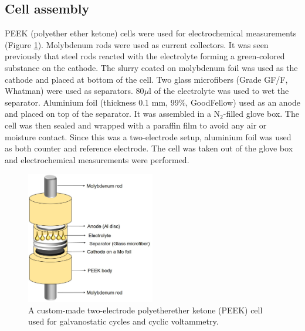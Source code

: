 \documentclass{article}
\begin{document}
\subsection{Cell assembly}
PEEK (polyether ether ketone) cells were used for electrochemical measurements (Figure \ref{fig:PEEK}). Molybdenum rods were used as current collectors. It was seen previously that steel rods reacted with the electrolyte forming a green-colored substance on the cathode. The slurry coated on molybdenum foil was used as the cathode and placed at bottom of the cell. Two glass microfibers (Grade GF/F, Whatman) were used as separators. 80$\mu$l of the electrolyte was used to wet the separator. Aluminium foil (thickness 0.1 mm, 99$\%$, GoodFellow) used as an anode and placed on top of the separator. It was assembled in a N$_2$-filled glove box. The cell was then sealed and wrapped with a paraffin film to avoid any air or moisture contact. Since this was a two-electrode setup, aluminium foil was used as both counter and reference electrode. The cell was taken out of the glove box and electrochemical measurements were performed. 

\begin{figure}[th!]
\centering
\includegraphics[width=0.5\textwidth]{fig/PEEK}
\caption{A custom-made two-electrode polyetherether ketone (PEEK) cell used for galvanostatic cycles and cyclic voltammetry.}
\label{fig:PEEK}
\end{figure}




 
\end{document}
